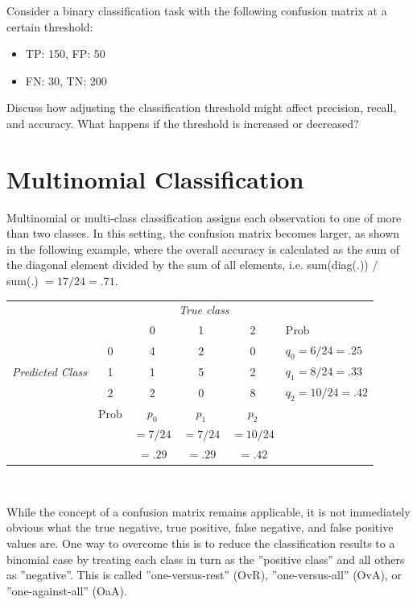 \begin{exerciseboxpaper}
Consider a binary classification task with the following confusion matrix at a certain threshold:
  \begin{itemize}
    \item TP: 150, FP: 50
    \item FN: 30, TN: 200
  \end{itemize}
  Discuss how adjusting the classification threshold might affect precision, recall, and accuracy. What happens if the threshold is increased or decreased?
\end{exerciseboxpaper}

\section{Multinomial Classification}

Multinomial or multi-class classification assigns each observation to one of more than two classes. In this setting, the confusion matrix becomes larger, as shown in the following example, where the overall accuracy is calculated as the sum of the diagonal element divided by the sum of all elements, i.e. sum(diag(.)) / sum(.) $=17/24=.71$.

\begin{center}
\vspace{\baselineskip}
\renewcommand{\arraystretch}{1.25}

\begin{tabular}{cc|ccc|l} \hline
     & & \multicolumn{3}{c|}{\emph{True class}} \\
                 &   & 0 & 1 & 2 & Prob \\ \hline
\multirow{3}{1.1cm}{\emph{Predicted Class}} & 0 & 4 & 2 & 0 & $q_0 = 6/24  = .25$ \\ 
                 & 1 & 1 & 5 & 2 & $q_1 = 8/24  = .33$ \\
                 & 2 & 2 & 0 & 8 & $q_2 = 10/24 = .42$ \\ \hline
     & Prob & $p_0$ & $p_1$ & $p_2$ &  \\
     &      & $=7/24$ & $=7/24$ & $=10/24$ &  \\ 
     &      & $=.29$ & $=.29$ & $=.42$ &  \\ \hline
\end{tabular} \\
\vspace{\baselineskip}
\end{center}

While the concept of a confusion matrix remains applicable, it is not immediately obvious what the true negative, true positive, false negative, and false positive values are.  One way to overcome this is to reduce the classification results to a binomial case by treating each class in turn as the ''positive class'' and all others as ''negative''. This is called ''one-versus-rest'' (OvR), ''one-versus-all'' (OvA), or ''one-against-all'' (OaA). 

